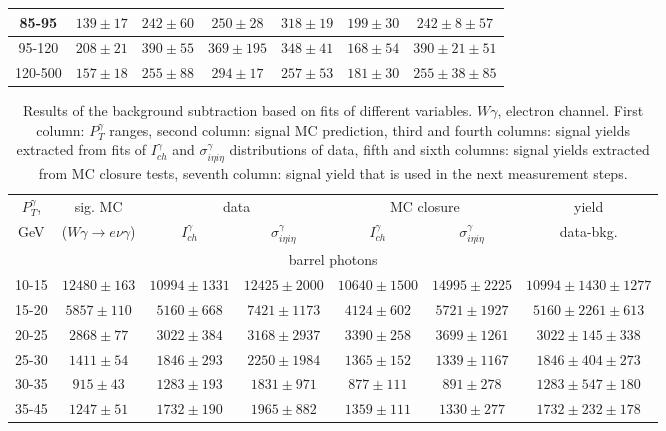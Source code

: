 \begin{table}[h]
\begin{center}
\begin{tabular}{|c|c|c|c|c|c|c|}
    85-95 & $139\pm17$ & $242\pm60$ & $250\pm28$ & $318\pm19$ & $199\pm30$ &$242\pm8\pm57$  \\ \hline
    95-120 & $208\pm21$ & $390\pm55$ & $369\pm195$ & $348\pm41$ & $168\pm54$ &$390\pm21\pm51$  \\ \hline
    120-500 & $157\pm18$ & $255\pm88$ & $294\pm17$ & $257\pm53$ & $181\pm30$ &$255\pm38\pm85$  \\ \hline
  \end{tabular}
  \label{tab:diff_ways_to_fit_phoEt_muon}
  \end{center}
\end{table}

\begin{table}[h]
  \tiny
  \begin{center}
  \caption{Results of the background subtraction based on fits of different variables. $W\gamma$, electron channel. First column: $P_T^{\gamma}$ ranges, second column: signal MC prediction, third and fourth columns: signal yields extracted from fits of $I_{ch}^{\gamma}$ and $\sigma_{i\eta i\eta}^\gamma$ distributions of data, fifth and sixth columns: signal yields extracted from MC closure tests, seventh column: signal yield that is used in the next measurement steps.}
  \begin{tabular}{|c|c|c|c|c|c|c|}
    $P_T^{\gamma}$, &  sig. MC   & \multicolumn{2}{|c|}{data}  & \multicolumn{2}{|c|}{MC closure} & yield\\ 
    GeV & ($W\gamma\rightarrow e\nu\gamma$) & $I_{ch}^{\gamma}$ & $\sigma_{i\eta i\eta}^\gamma$  & $I_{ch}^{\gamma}$  & $\sigma_{i\eta i\eta}^\gamma$   & data-bkg. \\ \hline
    \multicolumn{7}{|c|}{barrel photons} \\ \hline
    10-15 & $12480\pm163$ & $10994\pm1331$ & $12425\pm2000$ & $10640\pm1500$ & $14995\pm2225$ &$10994\pm1430\pm1277$  \\ \hline
    15-20 & $5857\pm110$ & $5160\pm668$ & $7421\pm1173$ & $4124\pm602$ & $5721\pm1927$ &$5160\pm2261\pm613$  \\ \hline
    20-25 & $2868\pm77$ & $3022\pm384$ & $3168\pm2937$ & $3390\pm258$ & $3699\pm1261$ &$3022\pm145\pm338$  \\ \hline
    25-30 & $1411\pm54$ & $1846\pm293$ & $2250\pm1984$ & $1365\pm152$ & $1339\pm1167$ &$1846\pm404\pm273$  \\ \hline
    30-35 & $915\pm43$ & $1283\pm193$ & $1831\pm971$ & $877\pm111$ & $891\pm278$ &$1283\pm547\pm180$  \\ \hline
    35-45 & $1247\pm51$ & $1732\pm190$ & $1965\pm882$ & $1359\pm111$ & $1330\pm277$ &$1732\pm232\pm178$  \\ \hline

\end{tabular}
\end{center}
\end{table}
